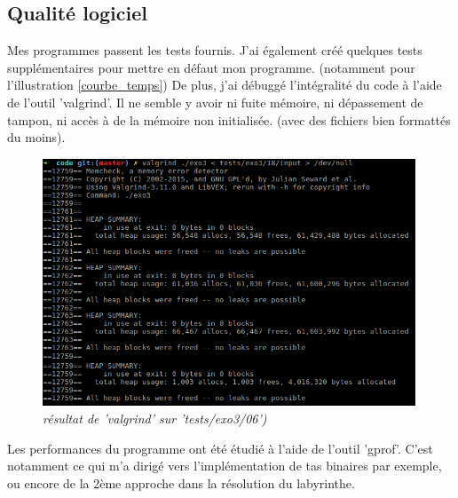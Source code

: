 \documentclass[10pt]{article}
\begin{document}
		\subsection{Qualité logiciel}
			Mes programmes passent les tests fournis. J'ai également créé quelques tests supplémentaires pour mettre en défaut mon programme.
			(notamment pour l'illustration \ref{courbe_temps})\newline
			De plus, j'ai débuggé l'intégralité du code à l'aide de l'outil 'valgrind'.
			Il ne semble y avoir ni fuite mémoire, ni dépassement de tampon, ni accès à de la mémoire non initialisée.
			(avec des fichiers bien formattés du moins).
			\begin{figure}[H]
				\begin{center}
					\includegraphics[width=12cm,height=\textheight,keepaspectratio]{./images/valgrind.png}
				\end{center}
				\caption{\textit{résultat de 'valgrind' sur 'tests/exo3/06')}}
			\end{figure}
			Les performances du programme ont été étudié à l'aide de l'outil 'gprof'.
			C'est notamment ce qui m'a dirigé vers l'implémentation de tas binaires par exemple,
			ou encore de la 2ème approche dans la résolution du labyrinthe.

	\newpage
\end{document}
